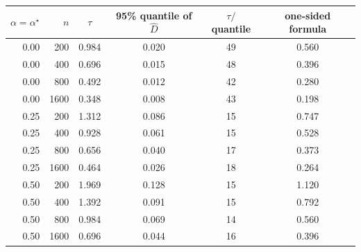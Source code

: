 \begin{tabular}{rrcccc}
\toprule
$\alpha=\alpha^\star$ & $n$ & $\tau$ & 95\% quantile of $\widehat D$ & $\tau/$quantile & one-sided formula \\
\midrule
0.00 & 200 & 0.984 & 0.020 & 49 & 0.560 \\
0.00 & 400 & 0.696 & 0.015 & 48 & 0.396 \\
0.00 & 800 & 0.492 & 0.012 & 42 & 0.280 \\
0.00 & 1600 & 0.348 & 0.008 & 43 & 0.198 \\
0.25 & 200 & 1.312 & 0.086 & 15 & 0.747 \\
0.25 & 400 & 0.928 & 0.061 & 15 & 0.528 \\
0.25 & 800 & 0.656 & 0.040 & 17 & 0.373 \\
0.25 & 1600 & 0.464 & 0.026 & 18 & 0.264 \\
0.50 & 200 & 1.969 & 0.128 & 15 & 1.120 \\
0.50 & 400 & 1.392 & 0.091 & 15 & 0.792 \\
0.50 & 800 & 0.984 & 0.069 & 14 & 0.560 \\
0.50 & 1600 & 0.696 & 0.044 & 16 & 0.396 \\
\bottomrule
\end{tabular}
